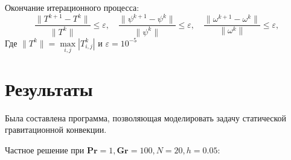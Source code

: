 \documentclass[a4paper, 12pt]{article}
\newcommand{\Pra}{\mathbf{Pr}}
\newcommand{\Gra}{\mathbf{Gr}}
\begin{document}
    Окончание итерационного процесса:
    $$
      \frac{\lVert T^{k+1} - T^k \rVert}{\lVert T^k \rVert} \leq \varepsilon,
        \quad
      \frac{\lVert \psi^{k+1} - \psi^k \rVert}{\lVert \psi^k \rVert} \leq
        \varepsilon, \quad
      \frac{\lVert \omega^{k+1} - \omega^k \rVert}{\lVert \omega^k \rVert} \leq
        \varepsilon,
    $$
    Где $\lVert T^k \rVert = \max\limits_{i,j} \left| T_{i,j}^{k} \right|$ и
    $\varepsilon = 10^{-5}$
  \pagebreak

  \section{Результаты}
    Была составлена программа, позволяющая моделировать задачу статической
    гравитационной конвекции.

    \bigskip
    Частное решение при $\Pra = 1, \Gra = 100, N = 20, h = 0.05$:
    \bigskip
\end{document}
